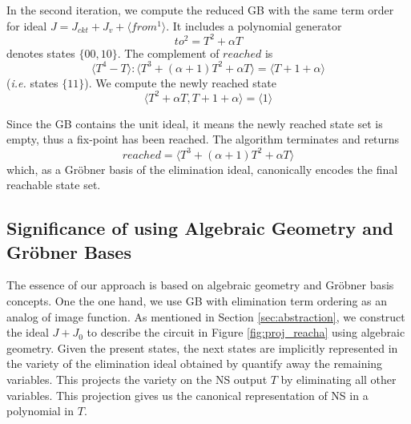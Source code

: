 \begin{Example}
In the second iteration, we compute the reduced GB with the same term
order for ideal $J = J_{ckt}+J_v+\langle from^1\rangle$. 
It includes a polynomial generator $$to^2 = T^2+\alpha T$$ denotes states
$\{00,10\}$. The complement of $reached$ is $$\langle T^4-T\rangle:\langle T^3+(\alpha+1)T^2+\alpha T\rangle
= \langle T + 1+\alpha\rangle$$ ({\it i.e.} states $\{11\}$). We compute the newly reached state 
$$\langle T^2+\alpha T, T+1+\alpha \rangle = \langle 1\rangle$$ 

Since the GB contains the unit ideal, it means the newly reached state
set is empty, thus a fix-point has been reached. The algorithm
terminates and returns $$reached = \langle T^3+(\alpha+1)T^2+\alpha
T\rangle$$ which, as a Gr\"obner basis of the elimination ideal,
canonically encodes the final reachable state set. 
\end{Example}


\subsection{Significance of using Algebraic Geometry and Gr\"obner Bases}
The essence of our approach is based on algebraic geometry and Gr\"obner basis concepts.
One the one hand, we use GB with elimination term ordering as an analog of image function.
As mentioned in Section \ref{sec:abstraction}, we construct the ideal $J+J_0$ to 
describe the circuit in Figure \ref{fig:proj_reacha} using algebraic geometry.
Given the present states, the next states are implicitly represented in the variety of 
the elimination ideal obtained by quantify away the remaining variables. 
This projects the variety on the NS output $T$ by eliminating all other variables.
This projection gives us the canonical representation of NS in a polynomial in $T$.

